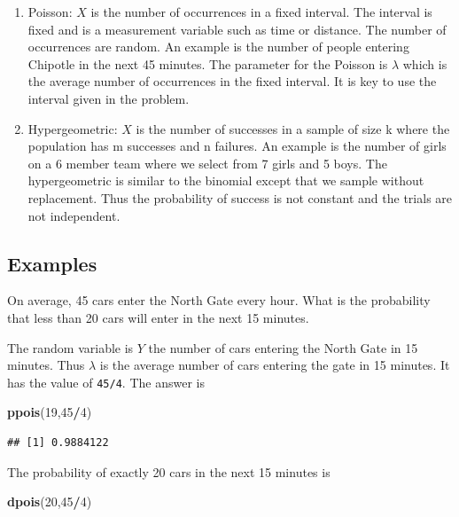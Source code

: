 \documentclass[]{book}
\newenvironment{Shaded}{\begin{snugshade}}{\end{snugshade}}
\newcommand{\KeywordTok}[1]{\textcolor[rgb]{0.13,0.29,0.53}{\textbf{#1}}}
\newcommand{\DecValTok}[1]{\textcolor[rgb]{0.00,0.00,0.81}{#1}}
\newcommand{\OperatorTok}[1]{\textcolor[rgb]{0.81,0.36,0.00}{\textbf{#1}}}
\newcommand{\NormalTok}[1]{#1}
\providecommand{\tightlist}{%
  \setlength{\itemsep}{0pt}\setlength{\parskip}{0pt}}
\theoremstyle{definition}
\theoremstyle{definition}
\theoremstyle{definition}
\theoremstyle{remark}
\begin{document}
\begin{enumerate}
\def\labelenumi{\arabic{enumi}.}
\setcounter{enumi}{3}
\tightlist
\item
  Poisson: \(X\) is the number of occurrences in a fixed interval. The
  interval is fixed and is a measurement variable such as time or
  distance. The number of occurrences are random. An example is the
  number of people entering Chipotle in the next 45 minutes. The
  parameter for the Poisson is \(\lambda\) which is the average number
  of occurrences in the fixed interval. It is key to use the interval
  given in the problem.\\
\item
  Hypergeometric: \(X\) is the number of successes in a sample of size k
  where the population has m successes and n failures. An example is the
  number of girls on a 6 member team where we select from 7 girls and 5
  boys. The hypergeometric is similar to the binomial except that we
  sample without replacement. Thus the probability of success is not
  constant and the trials are not independent.
\end{enumerate}

\subsection{Examples}\label{examples}

On average, 45 cars enter the North Gate every hour. What is the
probability that less than 20 cars will enter in the next 15 minutes.

The random variable is \(Y\) the number of cars entering the North Gate
in 15 minutes. Thus \(\lambda\) is the average number of cars entering
the gate in 15 minutes. It has the value of \texttt{45/4}. The answer is

\begin{Shaded}
\begin{Highlighting}[]
\KeywordTok{ppois}\NormalTok{(}\DecValTok{19}\NormalTok{,}\DecValTok{45}\OperatorTok{/}\DecValTok{4}\NormalTok{)}
\end{Highlighting}
\end{Shaded}

\begin{verbatim}
## [1] 0.9884122
\end{verbatim}

The probability of exactly 20 cars in the next 15 minutes is

\begin{Shaded}
\begin{Highlighting}[]
\KeywordTok{dpois}\NormalTok{(}\DecValTok{20}\NormalTok{,}\DecValTok{45}\OperatorTok{/}\DecValTok{4}\NormalTok{)}
\end{Highlighting}
\end{Shaded}
\end{document}
